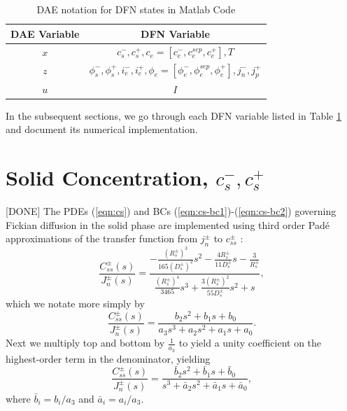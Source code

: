 \documentclass[12pt]{article}
\newcommand{\green}[1]{{\color{green}#1}}
\begin{document}
\begin{table}[h]
\caption{DAE notation for DFN states in Matlab Code}
\begin{center}
\begin{tabular}{c|c}
\hline \hline
\textbf{DAE Variable} & \textbf{DFN Variable} \\
\hline
$x$ & $c_{s}^{-}, c_{s}^{+}, c_{e} = [c_{e}^{-}, c_{e}^{sep}, c_{e}^{+}], T$ \\
$z$ & $\phi_{s}^{-}, \phi_{s}^{+}, i_{e}^{-}, i_{e}^{+}, \phi_{e} = [\phi_{e}^{-}, \phi_{e}^{sep}, \phi_{e}^{+}], j_{n}^{-}, j_{p}^{+}$ \\
$u$ & $I$ \\
\hline \hline
\end{tabular}
\end{center}
\label{tbl:dae-notation}
\end{table}%

In the subsequent sections, we go through each DFN variable listed in Table \ref{tbl:dae-notation} and document its numerical implementation.

\section{Solid Concentration, $c_{s}^{-}, c_{s}^{+}$}\label{sec:cs}
\green{[DONE]} The PDEs (\ref{eqn:cs}) and BCs (\ref{eqn:cs-bc1})-(\ref{eqn:cs-bc2}) governing Fickian diffusion in the solid phase are implemented using third order Pad\'{e} approximations of the transfer function from $j_{n}^{\pm}$ to $c_{ss}^{\pm}$ \cite{Forman2011a,Rahn2012}: 
\begin{equation}
	\frac{C_{ss}^{\pm}(s)}{J_{n}^{\pm}(s)} = \frac{-\frac{(R_{s}^{\pm})^3}{165 (D_{s}^{\pm})^2}s^{2} -\frac{4 R_{s}^{\pm}}{11 D_{s}^{\pm}}s -\frac{3}{R_{s}^{\pm} }  }{ \frac{(R_s^{\pm})^4}{3465}s^3 + \frac{3 (R_s^{\pm})^2}{55 D_s^{\pm}}s^2 + s },
\end{equation}
which we notate more simply by
\begin{equation}
	\frac{C_{ss}^{\pm}(s)}{J_{n}^{\pm}(s)} = \frac{b_2 s^{2} + b_1 s + b_0 }{ a_3 s^3 + a_2 s^2 + a_1 s + a_0 }.
\end{equation}
Next we multiply top and bottom by $\frac{1}{a_3}$ to yield a unity coefficient on the highest-order term in the denominator, yielding
\begin{equation}\label{eqn:cs-tf}
	\frac{C_{ss}^{\pm}(s)}{J_{n}^{\pm}(s)} = \frac{\bar{b}_2 s^{2} + \bar{b}_1 s + \bar{b}_0 }{ s^3 + \bar{a}_2 s^2 + \bar{a}_1 s + \bar{a}_0 },
\end{equation}
where $\bar{b}_i = b_i/a_3$ and $\bar{a}_i = a_i/a_3$.
\end{document}
